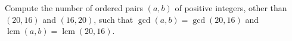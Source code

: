 Compute the number of ordered pairs $(a,b)$ of positive integers, other than $(20,16)$ and $(16,20)$, such that $\gcd(a,b)=\gcd(20,16)$ and $\operatorname{lcm}(a,b)=\operatorname{lcm}(20,16)$.
